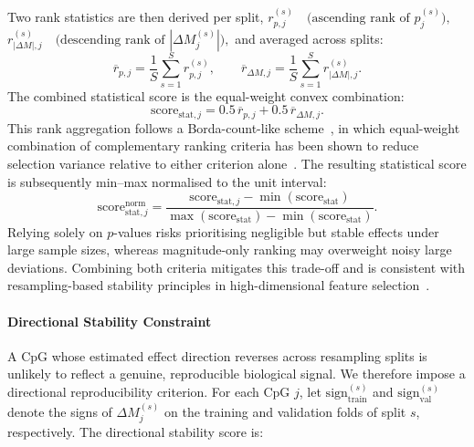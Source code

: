 Two rank statistics are then derived per split,
\(
r_{p,j}^{(s)} \quad \text{(ascending rank of } p_{j}^{(s)}),\)
\(r_{|\Delta M|,j}^{(s)} \quad 
\text{(descending rank of } |\Delta M_{j}^{(s)}|),
\)
and averaged across splits:
\begin{equation}
\overline{r}_{p,j}
=
\frac{1}{S}\sum_{s=1}^{S} r_{p,j}^{(s)},
\qquad
\overline{r}_{\Delta M,j}
=
\frac{1}{S}\sum_{s=1}^{S} r_{|\Delta M|,j}^{(s)}.
\end{equation}
The combined statistical score is the equal-weight convex 
combination:
\begin{equation}
\mathrm{score}_{\mathrm{stat},j}
=
0.5\,\overline{r}_{p,j}
+
0.5\,\overline{r}_{\Delta M,j}.
\end{equation}
This rank aggregation follows a Borda-count-like scheme~\cite{Fagin2003}, in which equal-weight combination of complementary ranking criteria has been shown to reduce selection variance relative to either criterion alone~\cite{Dwork2001}.
The resulting statistical score is subsequently min--max normalised 
to the unit interval:
\[
\mathrm{score}_{\mathrm{stat},j}^{\mathrm{norm}}
=
\frac{
\mathrm{score}_{\mathrm{stat},j}
-
\min(\mathrm{score}_{\mathrm{stat}})
}{
\max(\mathrm{score}_{\mathrm{stat}})
-
\min(\mathrm{score}_{\mathrm{stat}})
}.
\]
Relying solely on $p$-values risks prioritising negligible 
but stable effects under large sample sizes, whereas 
magnitude-only ranking may overweight noisy large 
deviations. Combining both criteria mitigates this trade-off and is consistent with resampling-based stability principles in high-dimensional feature selection~\cite{Meinshausen2010}.

\paragraph{Directional Stability Constraint}

A CpG whose estimated effect direction reverses across 
resampling splits is unlikely to reflect a genuine, 
reproducible biological signal. We therefore impose a 
directional reproducibility criterion. For each CpG $j$, 
let $\mathrm{sign}_{\mathrm{train}}^{(s)}$ and 
$\mathrm{sign}_{\mathrm{val}}^{(s)}$ denote the signs of 
$\Delta M_j^{(s)}$ on the training and validation folds 
of split $s$, respectively. The directional stability 
score is:

